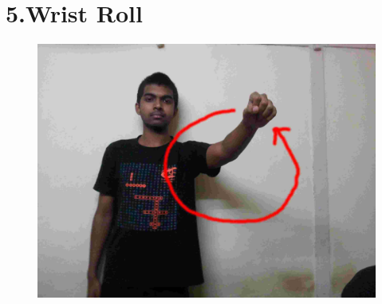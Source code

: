 \documentclass[a4wide]{scrreprt}
\begin{document}
\section*{5.Wrist Roll}
\begin{figure}[H]
\centering
\includegraphics[scale=0.1]{gestures/5.jpg}
\end{figure}
\end{document}
